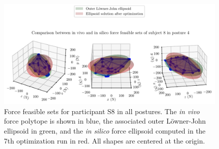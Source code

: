 \begin{figure}[!htb]
\begin{minipage}{1\linewidth}
    \end{minipage}
    \begin{minipage}{1\linewidth}
        \captionsetup{justification=centering}
        \centering
        \includegraphics[trim=0 0 0 60, clip, width=0.8\linewidth]{img/chapter_5/subject_163_solution_7_posture_4.pdf}
    \end{minipage}
    \caption{Force feasible sets for participant S8 in all postures. The \emph{in vivo} force polytope is shown in blue, the associated outer Löwner-John ellipsoid in green, and the \emph{in silico} force ellipsoid computed in the 7th optimization run in red. All shapes are centered at the origin.}
    \label{fig:sub8_7thsol}
\end{figure}

